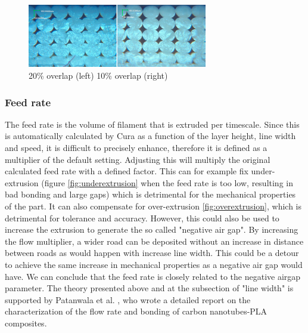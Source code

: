 \begin{figure}[htb]
    \centering
    \includegraphics[width=0.7\textwidth]{chapter_2/figures/Meso10and20.jpg}
    \caption{20\% overlap (left) 10\% overlap (right)\cite{Somireddy2017MechanicalMesostructure}}
    \label{fig:Meso10&20}
\end{figure}

\subsubsection{Feed rate}
The feed rate is the volume of filament that is extruded per timescale. Since this is automatically calculated by Cura as a function of the layer height, line width and speed, it is difficult to precisely enhance, therefore it is defined as a multiplier of the default setting. Adjusting this will multiply the original calculated feed rate with a defined factor. This can for example fix under-extrusion (figure \ref{fig:underextrusion} when the feed rate is too low, resulting in bad bonding and large gaps) which is detrimental for the mechanical properties of the part. It can also compensate for over-extrusion \ref{fig:overextrusion}, which is detrimental for tolerance and accuracy. However, this could also be used to increase the extrusion to generate the so called "negative air gap". By increasing the flow multiplier, a wider road can be deposited without an increase in distance between roads as would happen with increase line width. This could be a detour to achieve the same increase in mechanical properties as a negative air gap would have.
We can conclude that the feed rate is closely related to the negative airgap parameter. The theory presented above and at the subsection of "line width" is supported by Patanwala et al. \cite{Patanwala2018TheComposites}, who wrote a detailed report on the characterization of the flow rate and bonding of carbon nanotubes-PLA composites.  
